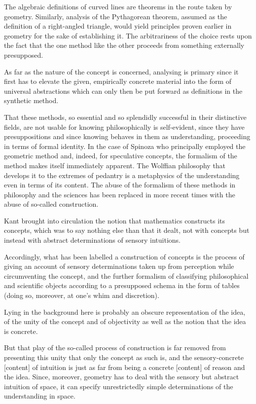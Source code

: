 The algebraic definitions of curved lines are
theorems in the route taken by geometry.
Similarly, analysis of the Pythagorean theorem,
assumed as the definition of a right-angled triangle,
would yield principles proven earlier in geometry
for the sake of establishing it.
The arbitrariness of the choice rests upon the fact that
the one method like the other proceeds from something externally presupposed.

As far as the nature of the concept is concerned,
analysing is primary since it first has to elevate the given,
empirically concrete material into the form of universal abstractions
which can only then be put forward as definitions in the synthetic method.

That these methods, so essential and so splendidly successful in
their distinctive fields, are not usable for knowing philosophically is
self-evident, since they have presuppositions and since knowing
behaves in them as understanding, proceeding in terms of formal identity.
In the case of Spinoza who principally employed the
geometric method and, indeed, for speculative concepts, the
formalism of the method makes itself immediately apparent.
The Wolffian philosophy that develops it to the extremes of pedantry is a
metaphysics of the understanding even in terms of its content.
The abuse of the formalism of these methods in philosophy and the
sciences has been replaced in more recent times with the abuse of
so-called construction.

Kant brought into circulation the notion that mathematics constructs its concepts,
which was to say nothing else than that it dealt, not with concepts but
instead with abstract determinations of sensory intuitions.

Accordingly, what has been labelled a construction of concepts is
the process of giving an account of sensory determinations taken up from perception
while circumventing the concept, and
the further formalism of classifying
philosophical and scientific objects according to a presupposed schema
in the form of tables (doing so, moreover, at one's whim and discretion).

Lying in the background here is probably an obscure representation of the idea,
of the unity of the concept and of objectivity as well as
the notion that the idea is concrete.

But that play of the so-called process of construction is
far removed from presenting this unity that only the concept as such is,
and the sensory-concrete [content] of intuition is just as far from
being a concrete [content] of reason and the idea.
Since, moreover, geometry has to deal with the sensory but abstract
intuition of space, it can specify unrestrictedly simple determinations
of the understanding in space.

